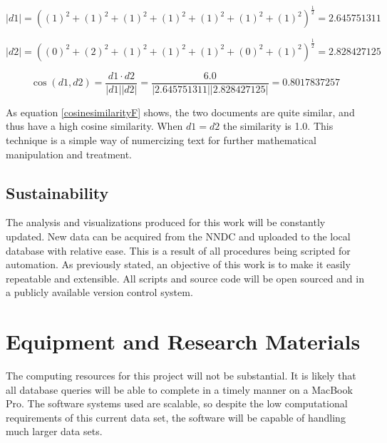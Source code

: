 \documentclass[12pt]{article}
\begin{document}
\begin{doublespacing}
\begin{equation} \label{cosinesimilarity2}
 \left| d1 \right| = \left( (1)^2 + (1)^2 + (1)^2 + (1)^2 + (1)^2 + (1)^2 + (1)^2 \right) ^{\frac{1}{2}} =  2.645751311
\end{equation}

\begin{equation} \label{cosinesimilarity3}
 \left| d2 \right| = \left( (0)^2 + (2)^2 + (1)^2 + (1)^2 + (1)^2 + (0)^2 + (1)^2 \right) ^{\frac{1}{2}} =  2.828427125
\end{equation}

\begin{equation} \label{cosinesimilarityF}
\cos (d1,d2) = \frac{d1 \cdot d2 }{\left| d1 \right| \left| d2 \right|} = \frac{6.0}{\left| 2.645751311 \right| \left| 2.828427125 \right|} = 0.8017837257
\end{equation}

As equation \ref{cosinesimilarityF} shows, the two documents are quite similar, and thus have a high cosine similarity.
When $d1 = d2$ the similarity is 1.0.
This technique is a simple way of numercizing text for further mathematical manipulation and treatment.


\subsection{Sustainability} \label{sustainability}
The analysis and visualizations produced for this work will be constantly updated.
New data can be acquired from the NNDC and uploaded to the local database with relative ease.
This is a result of all procedures being scripted for automation.
As previously stated, an objective of this work is to make it easily repeatable and extensible.
All scripts and source code will be open sourced and in a publicly available version control system.


\pagebreak
\section{Equipment and Research Materials}

The computing resources for this project will not be substantial.
It is likely that all database queries will be able to complete in a timely manner on a MacBook Pro.
The software systems used are scalable, so despite the low computational requirements of this current data set, the software will be capable of handling much larger data sets.


\end{doublespacing}
\end{document}

